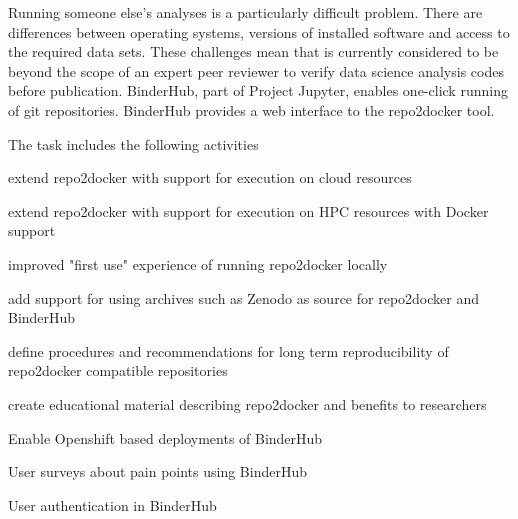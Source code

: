 \begin{task}[
  title=Further development of repo2docker and Binder,
  id=r2d-and-binder,
  lead=SRL,
  PM=36,
  wphases={0-48},
  partners={XFEL,WTT}
]
  Running someone else's analyses is a particularly difficult problem.
  There are differences between operating systems, versions of installed software and access to the required data sets.
  These challenges mean that is currently considered to be beyond the scope of an expert peer reviewer to verify data science analysis codes before publication.
  BinderHub, part of Project Jupyter, enables one-click running of git repositories.
  BinderHub provides a web interface to the repo2docker tool.

  The task includes the following activities
  \begin{compactitem}
  \item extend repo2docker with support for execution on cloud resources
  \item extend repo2docker with support for execution on HPC resources with Docker support
  \item improved "first use" experience of running repo2docker locally
  \item add support for using archives such as Zenodo as source for repo2docker and BinderHub
  \item define procedures and recommendations for long term reproducibility of repo2docker compatible repositories
  \item create educational material describing repo2docker and benefits to researchers
  \item Enable Openshift based deployments of BinderHub
  \item User surveys about pain points using BinderHub
  \item User authentication in BinderHub
  \end{compactitem}
\end{task}
